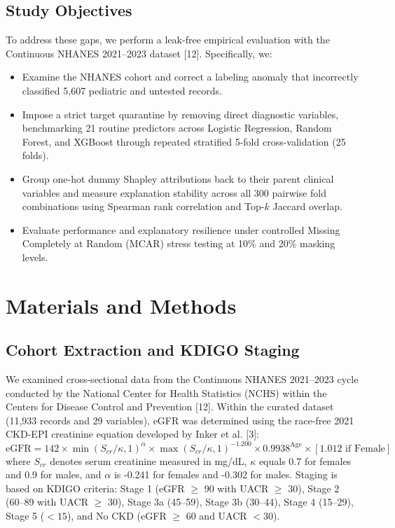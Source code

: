 \documentclass[runningheads]{llncs}
\begin{document}
\subsection{Study Objectives}
To address these gaps, we perform a leak-free empirical evaluation with the Continuous NHANES 2021–2023 dataset [12]. Specifically, we:
\begin{itemize}
    \item Examine the NHANES cohort and correct a labeling anomaly that incorrectly classified 5,607 pediatric and untested records.
    \item Impose a strict target quarantine by removing direct diagnostic variables, benchmarking 21 routine predictors across Logistic Regression, Random Forest, and XGBoost through repeated stratified 5-fold cross-validation (25 folds).
    \item Group one-hot dummy Shapley attributions back to their parent clinical variables and measure explanation stability across all 300 pairwise fold combinations using Spearman rank correlation and Top-$k$ Jaccard overlap.
    \item Evaluate performance and explanatory resilience under controlled Missing Completely at Random (MCAR) stress testing at 10\% and 20\% masking levels.
\end{itemize}

\section{Materials and Methods}
\subsection{Cohort Extraction and KDIGO Staging}
We examined cross-sectional data from the Continuous NHANES 2021–2023 cycle conducted by the National Center for Health Statistics (NCHS) within the Centers for Disease Control and Prevention [12]. Within the curated dataset (11,933 records and 29 variables), eGFR was determined using the race-free 2021 CKD-EPI creatinine equation developed by Inker et al. [3]:
\begin{equation}
\text{eGFR} = 142 \times \min(S_{cr} / \kappa, 1)^\alpha \times \max(S_{cr} / \kappa, 1)^{-1.200} \times 0.9938^{\text{Age}} \times [1.012 \text{ if Female}]
\end{equation}
where $S_{cr}$ denotes serum creatinine measured in mg/dL, $\kappa$ equals 0.7 for females and 0.9 for males, and $\alpha$ is -0.241 for females and -0.302 for males. Staging is based on KDIGO criteria: Stage 1 (eGFR $\ge$ 90 with UACR $\ge$ 30), Stage 2 (60–89 with UACR $\ge$ 30), Stage 3a (45–59), Stage 3b (30–44), Stage 4 (15–29), Stage 5 ($<15$), and No CKD (eGFR $\ge$ 60 and UACR $< 30$).
\end{document}
